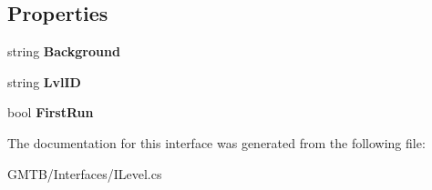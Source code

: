 \subsection*{Properties}
\begin{DoxyCompactItemize}
\item 
\mbox{\label{interface_g_m_t_b_1_1_interfaces_1_1_i_level_a30737ff3a06dd9304be88b07de49bd82}} 
string {\bfseries Background}
\item 
\mbox{\label{interface_g_m_t_b_1_1_interfaces_1_1_i_level_a4d4c16bfa70f8ebd5024ea52bcc3d064}} 
string {\bfseries Lvl\+ID}
\item 
\mbox{\label{interface_g_m_t_b_1_1_interfaces_1_1_i_level_a1d8a0db7460531f64c3fdc7b2d171769}} 
bool {\bfseries First\+Run}
\end{DoxyCompactItemize}


The documentation for this interface was generated from the following file\+:\begin{DoxyCompactItemize}
\item 
G\+M\+T\+B/\+Interfaces/I\+Level.\+cs\end{DoxyCompactItemize}
